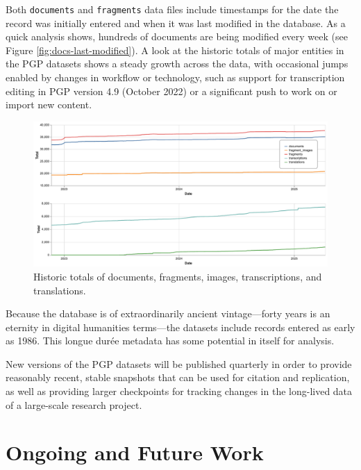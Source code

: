 \documentclass{article}
\begin{document}
Both \texttt{documents} and \texttt{fragments} data files include timestamps for the date the record was initially entered and when it was last modified in the database. As a quick analysis shows, hundreds of documents are being modified every week (see Figure \ref{fig:docs-last-modified}). A look at the historic totals of major entities in the PGP datasets shows a steady growth across the data, with occasional jumps enabled by changes in workflow or technology, such as support for transcription editing in PGP version 4.9 (October 2022) or a significant push to work on or import new content.

\begin{figure}[!hbt]
  \includegraphics[width=\textwidth]{charts/combined_totals_historic.pdf}
  \centering
  \caption{Historic totals of documents, fragments, images, transcriptions, and translations.}
  \label{fig:historic-totals}
\end{figure}

Because the database is of extraordinarily ancient vintage—forty years is an eternity in digital humanities terms—the datasets include records entered as early as 1986. This longue durée metadata has some potential in itself for analysis.

New versions of the PGP datasets will be published quarterly in order to provide reasonably recent, stable snapshots that can be used for citation and replication, as well as providing larger checkpoints for tracking changes in the long-lived data of a large-scale research project. 

\section{Ongoing and Future Work}
\end{document}
